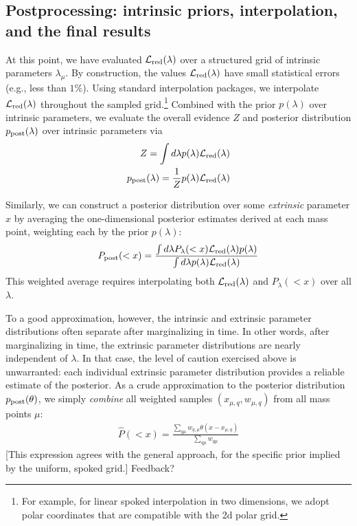 \subsection{Postprocessing: intrinsic priors, interpolation, and the final results}

At this point, we have evaluated ${{\cal L}_{\rm red}}(\lambda)$ over a structured grid of intrinsic parameters $\lambda_\mu$.  
%
By construction,  the values ${{\cal L}_{\rm red}}(\lambda)$ have small statistical errors (e.g., less than $1\%$).   Using standard
interpolation packages, we interpolate ${{\cal L}_{\rm red}}(\lambda)$ throughout the sampled grid.\footnote{For example, for linear
spoked interpolation in two dimensions, we adopt polar coordinates that are compatible with the 2d polar grid.}
%
Combined with the prior $p(\lambda)$ over intrinsic parameters, we evaluate the overall evidence $Z$ and posterior
distribution $p_{\rm post}(\lambda)$ over intrinsic parameters via
\begin{eqnarray}
Z = \int d\lambda p(\lambda) {{\cal L}_{\rm red}}(\lambda) \\
p_{\rm post}(\lambda) = \frac{1}{Z} p(\lambda) {{\cal L}_{\rm red}}(\lambda)
\end{eqnarray}
%

Similarly, we can construct a posterior distribution over some \emph{extrinsic} parameter $x$ by averaging the one-dimensional posterior estimates derived at
each mass point, weighting each by the prior $p(\lambda)$:
\begin{eqnarray}
P_{\rm post}(<x) = \frac{\int d\lambda P_\lambda(<x) {{\cal L}_{\rm red}}(\lambda) p(\lambda)}{\int d \lambda p(\lambda) {{\cal L}_{\rm red}}(\lambda)}
\end{eqnarray}
This weighted average requires interpolating both ${{\cal L}_{\rm red}}(\lambda)$ and $P_\lambda(<x)$ over all $\lambda$.  


To a good approximation, however, the intrinsic and extrinsic parameter distributions often separate after marginalizing
in time.  In other words, after marginalizing in time, the extrinsic parameter distributions are nearly independent of $\lambda$.  
In that case, the level of caution exercised above is unwarranted:  each individual
extrinsic parameter distribution provides a reliable estimate of the posterior.  As a crude approximation to the posterior distribution $p_{\rm post}(\theta)$, we  simply \emph{combine} all
weighted samples $(x_{\mu,q},w_{\mu,q})$ from all mass points $\mu$:
\begin{eqnarray}
\hat{P}(<x) = \frac{\sum_{q\mu} w_{q,\mu}\theta(x-x_{\mu,q})}{\sum_{q\mu} w_{q\mu}}
\end{eqnarray}
[This expression agrees with the general approach, for the specific prior implied by the uniform, spoked grid.]
{\color{blue} Feedback?}


